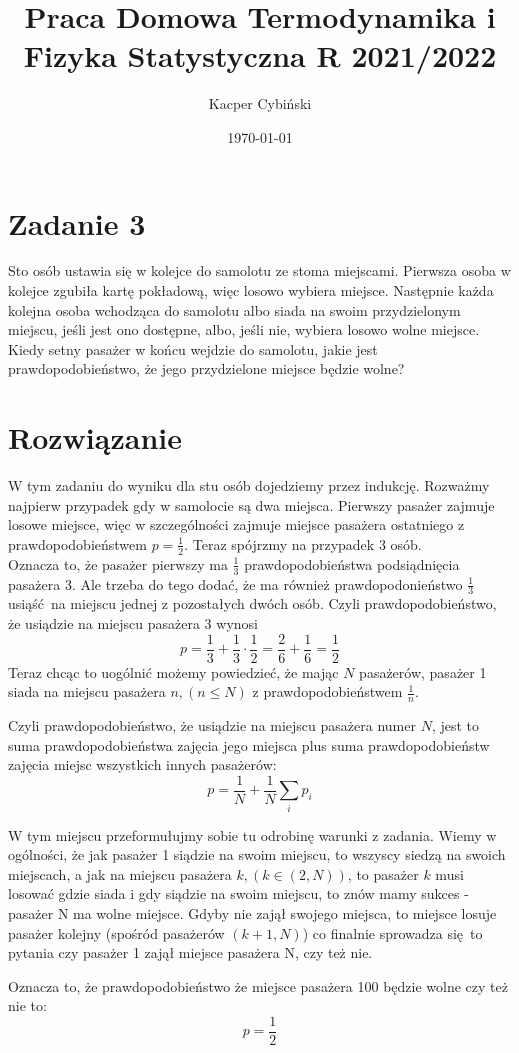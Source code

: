 \documentclass[12pt,a4paper]{article}
\title{Praca Domowa Termodynamika i Fizyka Statystyczna R 2021/2022}
\author{Kacper Cybiński}
\date{\today}
\begin{document}
\maketitle

\section{Zadanie 3}



Sto osób ustawia się w kolejce do samolotu ze stoma miejscami. Pierwsza osoba w kolejce zgubiła kartę pokładową, więc losowo wybiera miejsce. Następnie każda kolejna osoba wchodząca do samolotu albo siada na swoim przydzielonym miejscu, jeśli jest ono dostępne, albo, jeśli nie, wybiera losowo wolne miejsce. Kiedy setny pasażer w końcu wejdzie do samolotu, jakie jest prawdopodobieństwo, że jego przydzielone miejsce będzie wolne?


\section{Rozwiązanie}

W tym zadaniu do wyniku dla stu osób dojedziemy przez indukcję.
Rozważmy najpierw przypadek gdy w samolocie są dwa miejsca. Pierwszy pasażer zajmuje losowe miejsce, więc w szczególności zajmuje miejsce pasażera ostatniego z prawdopodobieństwem $p = \frac12$. 
Teraz spójrzmy na przypadek 3 osób.\\
Oznacza to, że pasażer pierwszy ma $\frac13$ prawdopodobieństwa podsiądnięcia pasażera 3. Ale trzeba do tego dodać, że ma również prawdopodonieństwo $\frac13$ usiąść na miejscu jednej z pozostałych dwóch osób. Czyli prawdopodobieństwo, że usiądzie na miejscu pasażera 3 wynosi 
\[
 p = \frac13 + \frac13 \cdot \frac12 = \frac26 + \frac16 = \frac12
\]
Teraz chcąc to uogólnić możemy powiedzieć, że mając $N$ pasażerów, pasażer 1 siada na miejscu pasażera $n, (n \leq N)$ z prawdopodobieństwem $\frac{1}{n}$. 

Czyli prawdopodobieństwo, że usiądzie na miejscu pasażera numer $N$, jest to suma prawdopodobieństwa zajęcia jego miejsca plus suma prawdopodobieństw zajęcia miejsc wszystkich innych pasażerów:
\[
    p = \frac{1}{N} + \frac{1}{N} \sum_i p_i
\]

W tym miejscu przeformułujmy sobie tu odrobinę warunki z zadania. Wiemy w ogólności, że jak pasażer 1 siądzie na swoim miejscu, to wszyscy siedzą na swoich miejscach, a jak na miejscu pasażera $k, (k \in (2, N))$, to pasażer $k$ musi losować gdzie siada i gdy siądzie na swoim miejscu, to znów mamy sukces - pasażer N ma wolne miejsce. Gdyby nie zajął swojego miejsca, to miejsce losuje pasażer kolejny (spośród pasażerów $(k+1, N)$) co finalnie sprowadza się to pytania czy pasażer 1 zajął miejsce pasażera N, czy też nie.

Oznacza to, że prawdopodobieństwo że miejsce pasażera 100 będzie wolne czy też nie to:
\[
    p =\frac12
\]
\end{document}
